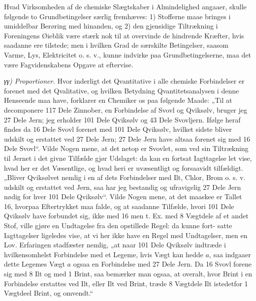 \documentclass[12pt,a4paper]{book}
\begin{document}
Hvad Virksomheden af de chemiske Slægtskaber i Almindelighed
angaaer, skulle følgende to Grundbetingelser særlig fremhæves:
1) Stofferne maae bringes i umiddelbar Berøring med hinanden, og
2) den gjensidige Tiltrækning i Foreningens Øieblik være stærk nok
til at overvinde de hindrende Kræfter, hvis saadanne ere tilstede;
men i hvilken Grad de særskilte Betingelser, saasom Varme, Lys,
Elektricitet o. s. v., kunne indvirke paa Grundbetingelserne, maa
det være Fagvidenskabens Opgave at eftervise.

\emph{γγ) Proportioner.} Hvor inderligt det Qvantitative i alle
chemiske Forbindelser er forenet med det Qvalitative, og hvilken
Betydning Qvantitetsanalysen i denne Henseende maa have, forklarer
en Chemiker os paa følgende Maade: „Til at decomponere 117 Dele
Zinnober, en Forbindelse af Svovl og Qviksølv, bruger jeg 27 Dele
Jern; jeg erholder 101 Dele Qviksølv og 43 Dele Svovljern. Ifølge
heraf findes da 16 Dele Svovl forenet med 101 Dele Qviksølv,
hvilket sidste bliver udskilt og erstattet ved 27 Dele Jern; 27
Dele Jern have altsaa forenet sig med 16 Dele Svovl“. Vilde Nogen
mene, at det netop er Svovlet, som ved sin Tiltrækning til Jernet i
det givne Tilfælde gjør Udslaget: da kan en fortsat Iagttagelse let
vise, hvad her er det Væsentlige, og hvad heri er uvæsentligt og
forsaavidt tilfældigt. „Bliver Qviksølvet nemlig i en af dets
Forbindelser med Ilt, Chlor, Brom o. s. v. udskilt og erstattet ved
Jern, saa har jeg bestandig og ufravigelig 27 Dele Jern nødig for
hver 101 Dele Qviksølv“. Vilde Nogen mene, at det maaskee er Tallet
16, hvorpaa Eftertrykket maa falde, og at saadanne Tilfælde, hvori
101 Dele Qviksølv have forbundet sig, ikke med 16 men t. Ex. med 8
Vægtdele af et andet Stof, ville gjøre en Undtagelse fra den
opstillede Regel: da kunne fort-
\setcounter{footnote}{0}
satte Iagttagelser ligeledes vise, at vi her ikke have en Regel med
Undtagelser, men en Lov. Erfaringen stadfæster nemlig, „at naar 101
Dele Qviksølv indtræde i hvilkensomhelst Forbindelse med et Legeme,
hvis Vægt kan hedde $a$, saa indgaaer dette Legemes Vægt $a$ ogsaa
en Forbindelse med 27 Dele Jern. Da 16 Svovl forene sig med 8 Ilt
og med 1 Brint, saa bemærker man ogsaa, at overalt, hvor Brint i en
Forbindelse erstattes ved Ilt, eller Ilt ved Brint, træde 8
Vægtdele Ilt istedetfor 1 Vægtdeel Brint, og omvendt.“
\end{document}
